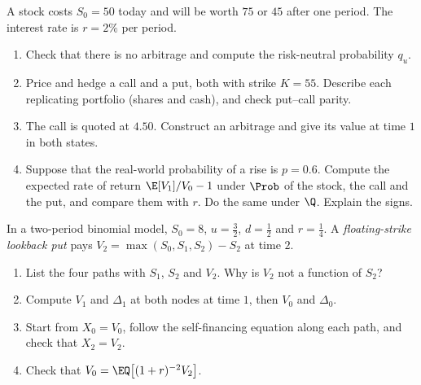 
\begin{exercise}\label{ex:bin-one-period}
\easy A stock costs $S_0=50$ today and will be worth $75$ or $45$ after one period. The
interest rate is $r=2\%$ per period.
\begin{enumerate}[label=(\alph*)]
  \item Check that there is no arbitrage and compute the risk-neutral probability $q_u$.
  \item Price and hedge a call and a put, both with strike $K=55$. Describe each
    replicating portfolio (shares and cash), and check put--call parity.
  \item The call is quoted at $4.50$. Construct an arbitrage and give its value at time
    $1$ in both states.
  \item Suppose that the real-world probability of a rise is $p=0.6$. Compute the expected
    rate of return $\E[V_1]/V_0-1$ under $\Prob$ of the stock, the call and the put, and
    compare them with $r$. Do the same under $\Q$. Explain the signs.
\end{enumerate}
\end{exercise}

\begin{exercise}\label{ex:bin-lookback}
\medium In a two-period binomial model, $S_0=8$, $u=\frac32$, $d=\frac12$ and
$r=\frac14$. A \emph{floating-strike lookback put} pays $V_2=\max(S_0,S_1,S_2)-S_2$ at
time $2$.
\begin{enumerate}[label=(\alph*)]
  \item List the four paths with $S_1$, $S_2$ and $V_2$. Why is $V_2$ not a function of
    $S_2$?
  \item Compute $V_1$ and $\Delta_1$ at both nodes at time $1$, then $V_0$ and $\Delta_0$.
  \item Start from $X_0=V_0$, follow the self-financing equation
     along each path, and check that $X_2=V_2$.
  \item Check that $V_0=\EQ\big[(1+r)^{-2}V_2\big]$.
\end{enumerate}
\end{exercise}

